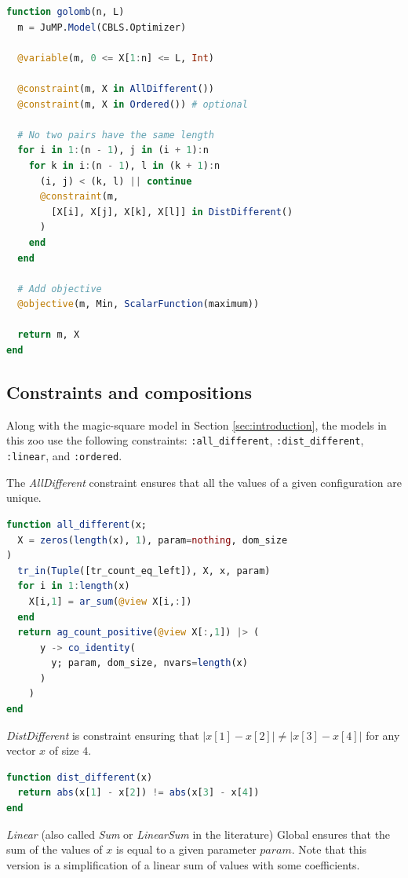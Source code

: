 \documentclass{juliacon}
\begin{document}
\begin{lstlisting}[language = Julia]
function golomb(n, L)
  m = JuMP.Model(CBLS.Optimizer)

  @variable(m, 0 <= X[1:n] <= L, Int)

  @constraint(m, X in AllDifferent())
  @constraint(m, X in Ordered()) # optional

  # No two pairs have the same length
  for i in 1:(n - 1), j in (i + 1):n
    for k in i:(n - 1), l in (k + 1):n
      (i, j) < (k, l) || continue
      @constraint(m,
        [X[i], X[j], X[k], X[l]] in DistDifferent()
      )
    end
  end

  # Add objective
  @objective(m, Min, ScalarFunction(maximum))

  return m, X
end
\end{lstlisting}

\subsection{Constraints and compositions}
\label{subsec:constraints}

Along with the magic-square model in Section \ref{sec:introduction}, the models in this zoo use the following constraints: \texttt{:all\_different}, \texttt{:dist\_different}, \texttt{:linear}, and \texttt{:ordered}.

The \emph{AllDifferent} constraint ensures that all the values of a given configuration are unique.

\begin{lstlisting}[language = Julia]
function all_different(x;
  X = zeros(length(x), 1), param=nothing, dom_size
)
  tr_in(Tuple([tr_count_eq_left]), X, x, param)
  for i in 1:length(x)
    X[i,1] = ar_sum(@view X[i,:])
  end
  return ag_count_positive(@view X[:,1]) |> (
      y -> co_identity(
        y; param, dom_size, nvars=length(x)
      )
    )
end
\end{lstlisting}

\emph{DistDifferent} is constraint ensuring that \(|x[1] - x[2]| \neq |x[3] - x[4]|\) for any vector $x$ of size $4$.

\begin{lstlisting}[language = Julia]
function dist_different(x)
  return abs(x[1] - x[2]) != abs(x[3] - x[4])
end
\end{lstlisting}

\emph{Linear} (also called \emph{Sum} or \emph{LinearSum} in the literature) Global ensures that the sum of the values of $x$ is equal to a given parameter $param$. Note that this version is a simplification of a linear sum of values with some coefficients.
\end{document}
